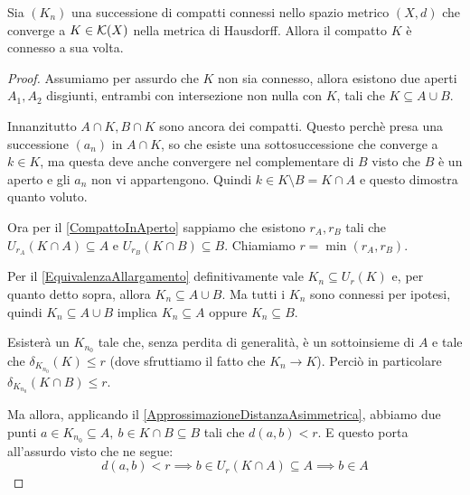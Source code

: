 \begin{theorem}
	Sia $(K_n)$ una successione di compatti connessi nello spazio metrico $(X,d)$ che converge a $K\in\mathcal{K}(X)$ nella metrica di Hausdorff. Allora il compatto $K$ è connesso a sua volta.
\end{theorem}
\begin{proof}
	Assumiamo per assurdo che $K$ non sia connesso, allora esistono due aperti $A_1,A_2$ disgiunti, entrambi con intersezione non nulla con $K$, tali che $K\subseteq A\cup B$.
	
	Innanzitutto $A\cap K, B\cap K$ sono ancora dei compatti. Questo perchè presa una successione $(a_n)$ in $A\cap K$, so che esiste una sottosuccessione che converge a $k\in K$, ma questa deve anche convergere nel complementare di $B$ visto che $B$ è un aperto e gli $a_n$ non vi appartengono. Quindi $k\in K\setminus B = K\cap A$ e questo dimostra quanto voluto.
	
	Ora per il \cref{CompattoInAperto} sappiamo che esistono $r_A,r_B$ tali che $U_{r_A}(K\cap A)\subseteq A$ e $U_{r_B}(K\cap B)\subseteq B$. Chiamiamo $r=\min(r_A,r_B)$.

	Per il \cref{EquivalenzaAllargamento} definitivamente vale $K_n\subseteq U_r(K)$ e, per quanto detto sopra, allora $K_n\subseteq A\cup B$. 
	Ma tutti i $K_n$ sono connessi per ipotesi, quindi $K_n\subseteq A\cup B$ implica $K_n\subseteq A$ oppure $K_n\subseteq B$.

	Esisterà un $K_{n_0}$ tale che, senza perdita di generalità, è un sottoinsieme di $A$ e tale che $\delta_{K_{n_0}}(K)\le r$ (dove sfruttiamo il fatto che $K_n\to K$). Perciò in particolare $\delta_{K_{n_0}}(K\cap B)\le r$.

	Ma allora, applicando il \cref{ApprossimazioneDistanzaAsimmetrica}, abbiamo due punti $a\in K_{n_0}\subseteq A,\ b\in K\cap B\subseteq B$ tali che $d(a,b)<r$. E questo porta all'assurdo visto che ne segue:
	\begin{equation*}
		d(a,b)<r\implies b\in U_r(K\cap A) \subseteq A \implies b\in A
	\end{equation*}
	

	
\end{proof}



